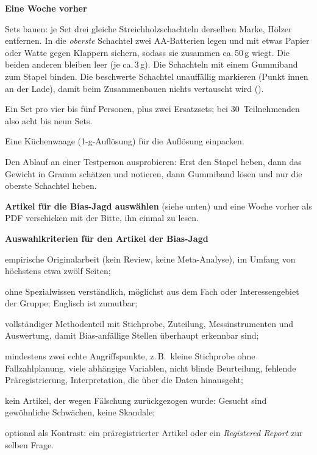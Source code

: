 \begin{vorbereitung}
\textbf{Eine Woche vorher}
\begin{checkliste}
  \item Sets bauen: je Set drei gleiche Streichholzschachteln derselben
    Marke, Hölzer entfernen. In die \emph{oberste} Schachtel zwei
    AA-Batterien legen und mit etwas Papier oder Watte gegen Klappern
    sichern, sodass sie zusammen ca.\,50\,g wiegt. Die beiden anderen
    bleiben leer (je ca.\,3\,g). Die Schachteln mit einem Gummiband zum
    Stapel binden. Die beschwerte Schachtel unauffällig markieren (Punkt
    innen an der Lade), damit beim Zusammenbauen nichts vertauscht wird
    ().
  \item Ein Set pro vier bis fünf Personen, plus zwei Ersatzsets; bei
    30~Teilnehmenden also acht bis neun Sets.
  \item Eine Küchenwaage (1-g-Auflösung) für die Auflösung einpacken.
  \item Den Ablauf an einer Testperson ausprobieren: Erst den Stapel heben,
    dann das Gewicht in Gramm schätzen und notieren, dann Gummiband
    lösen und nur die oberste Schachtel heben.
  \item \textbf{Artikel für die Bias-Jagd auswählen} (siehe unten) und
    eine Woche vorher als PDF verschicken mit der Bitte, ihn einmal zu
    lesen.
\end{checkliste}

\textbf{Auswahlkriterien für den Artikel der Bias-Jagd}
\begin{checkliste}
  \item empirische Originalarbeit (kein Review, keine Meta-Analyse), im
    Umfang von höchstens etwa zwölf Seiten;
  \item ohne Spezialwissen verständlich, möglichst aus dem Fach oder
    Interessengebiet der Gruppe; Englisch ist zumutbar;
  \item vollständiger Methodenteil mit Stichprobe, Zuteilung,
    Messinstrumenten und Auswertung, damit Bias-anfällige Stellen
    überhaupt erkennbar sind;
  \item mindestens zwei echte Angriffspunkte, z.\,B.\ kleine Stichprobe
    ohne Fallzahlplanung, viele abhängige Variablen, nicht blinde
    Beurteilung, fehlende Präregistrierung, Interpretation, die über die
    Daten hinausgeht;
  \item kein Artikel, der wegen Fälschung zurückgezogen wurde: Gesucht
    sind gewöhnliche Schwächen, keine Skandale;
  \item optional als Kontrast: ein präregistrierter Artikel oder ein
    \emph{Registered Report} zur selben Frage.
\end{checkliste}


\end{vorbereitung}
